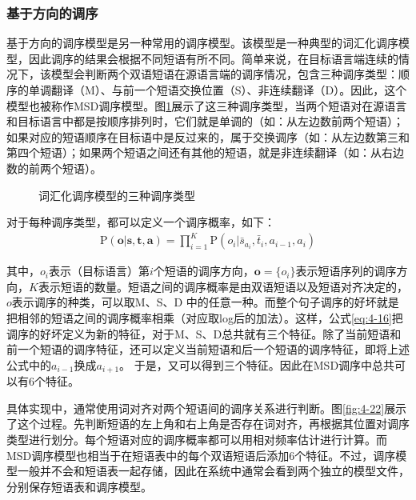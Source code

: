 
\subsubsection{基于方向的调序}

\parinterval 基于方向的调序模型是另一种常用的调序模型。该模型是一种典型的词汇化调序模型，因此调序的结果会根据不同短语有所不同。简单来说，在目标语言端连续的情况下，该模型会判断两个双语短语在源语言端的调序情况，包含三种调序类型：顺序的单调翻译（M）、与前一个短语交换位置（S）、非连续翻译（D）。因此，这个模型也被称作MSD调序模型\cite{Gros2008MSD}。图\ref{fig:4-21}展示了这三种调序类型，当两个短语对在源语言和目标语言中都是按顺序排列时，它们就是单调的（如：从左边数前两个短语）；如果对应的短语顺序在目标语中是反过来的，属于交换调序（如：从左边数第三和第四个短语）；如果两个短语之间还有其他的短语，就是非连续翻译（如：从右边数的前两个短语）。

\begin{figure}[htp]
\centering

\caption{词汇化调序模型的三种调序类型}
\label{fig:4-21}
\end{figure}

\parinterval 对于每种调序类型，都可以定义一个调序概率，如下：
\begin{eqnarray}
\textrm{P}(\mathbf{o}|\mathbf{s},\mathbf{t},\mathbf{a}) = \prod_{i=1}^{K} \textrm{P}(o_i| \bar{s}_{a_i}, \bar{t}_i, a_{i-1}, a_i)
\label{eq:4-16}
\end{eqnarray}

\noindent 其中，$o_i$表示（目标语言）第$i$个短语的调序方向，$\mathbf{o}=\{o_i\}$表示短语序列的调序方向，$K$表示短语的数量。短语之间的调序概率是由双语短语以及短语对齐决定的，$o$表示调序的种类，可以取M、S、D 中的任意一种。而整个句子调序的好坏就是把相邻的短语之间的调序概率相乘（对应取log后的加法）。这样，公式\ref{eq:4-16}把调序的好坏定义为新的特征，对于M、S、D总共就有三个特征。除了当前短语和前一个短语的调序特征，还可以定义当前短语和后一个短语的调序特征，即将上述公式中的$a_{i-1}$换成$a_{i+1}$。 于是，又可以得到三个特征。因此在MSD调序中总共可以有6个特征。

\parinterval 具体实现中，通常使用词对齐对两个短语间的调序关系进行判断。图\ref{fig:4-22}展示了这个过程。先判断短语的左上角和右上角是否存在词对齐，再根据其位置对调序类型进行划分。每个短语对应的调序概率都可以用相对频率估计进行计算。而MSD调序模型也相当于在短语表中的每个双语短语后添加6个特征。不过，调序模型一般并不会和短语表一起存储，因此在系统中通常会看到两个独立的模型文件，分别保存短语表和调序模型。

